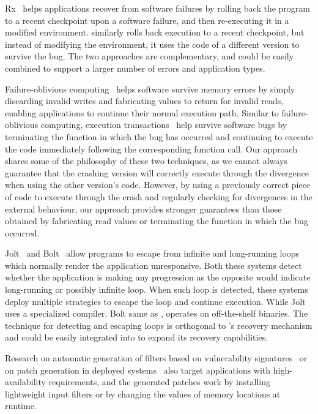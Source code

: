 Rx~\cite{rx} helps applications recover from software failures by
rolling back the program to a recent checkpoint upon a software
failure, and then re-executing it in a modified environment.  \mx
similarly rolls back execution to a recent checkpoint, but instead of
modifying the environment, it uses the code of a different version to
survive the bug.  The two approaches are complementary, and could be
easily combined to support a larger number of errors and application
types.

Failure-oblivious computing~\cite{fo} helps software survive memory
errors by simply discarding invalid writes and fabricating values to
return for invalid reads, enabling applications to continue their
normal execution path.  Similar to failure-oblivious computing,
execution transactions~\cite{exec-trans06} help survive software bugs
by terminating the function in which the bug has occurred and
continuing to execute the code immediately following the
corresponding function call.  Our approach shares some of the
philosophy of these two techniques, as we cannot always guarantee that
the crashing version will correctly execute through the divergence
when using the other version's code.
However, by using a previously correct piece of code to execute
through the crash and regularly checking for divergences in the
external behaviour, our approach provides stronger guarantees than
those obtained by fabricating read values or terminating the function
in which the bug occurred.

Jolt~\cite{jolt} and Bolt~\cite{bolt} allow programs to escape from infinite
and long-running loops which normally render the application unresponsive. Both
these systems detect whether the application is making any progression as the
opposite would indicate long-running or possibly infinite loop. When such loop
is detected, these systems deploy multiple strategies to escape the loop and
continue execution.  While Jolt uses a specialized compiler, Bolt same as \mx,
operates on off-the-shelf binaries. The technique for detecting and escaping
loops is orthogonal to \mx's recovery mechanism and could be easily integrated
into \rem to expand its recovery capabilities.

Research on automatic generation of filters based on vulnerability
signatures~\cite{song:oakland06,vigilante} 
or on patch
generation in deployed systems~\cite{clearview}
also target applications with high-availability requirements, and the
generated patches work by installing lightweight input filters or by changing
the values of memory locations at runtime.

